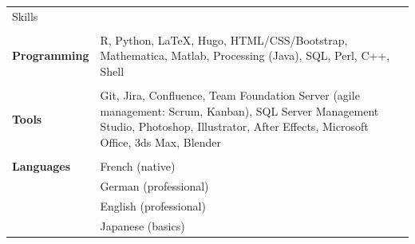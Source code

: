 \documentclass[a4paper,11pt,oneside]{article}
\begin{document}
\vspace{1em}

\noindent {\color{gray}\hrule} 
   
\vspace{1em}
   
\noindent \begin{longtable}{@{}p{3.1cm}@{}@{}p{13.9cm}@{}}
   \Large{Skills} & \\
   & \\
   \textbf{Programming} & R, Python, LaTeX, Hugo, HTML/CSS/Bootstrap, Mathematica, Matlab, Processing (Java), SQL, Perl, C++, Shell \\
   & \\   
   \textbf{Tools} & Git, Jira, Confluence, Team Foundation Server (agile management: Scrum, Kanban), SQL Server Management Studio, Photoshop, Illustrator, After Effects, Microsoft Office, 3ds Max, Blender \\
   & \\   
   \textbf{Languages} & French (native) \\
   & German (professional) \\
   & English (professional) \\
   & Japanese (basics)
\end{longtable}

\vspace{1em}

\noindent {\color{gray}\hrule} 
   
\vspace{1em}
   
\end{document}
